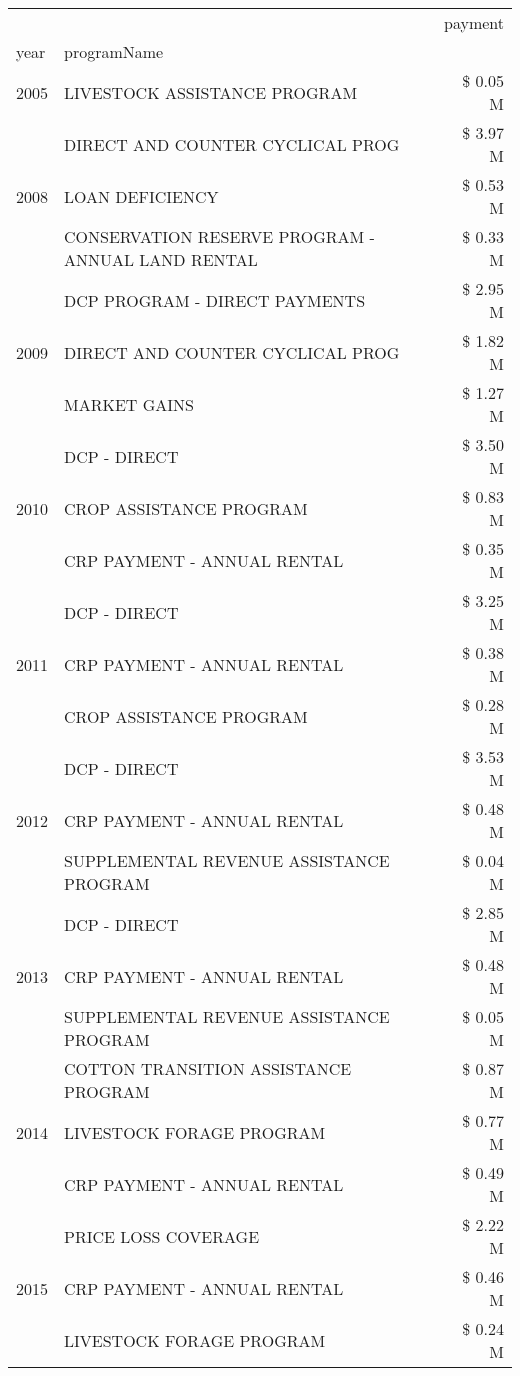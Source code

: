 \begin{tabular}{llr}
\toprule
 &  & payment \\
year & programName &  \\
\midrule
2005 & LIVESTOCK ASSISTANCE PROGRAM & \$ 0.05 M \\
\cline{1-3}
\multirow[t]{3}{*}{2008} & DIRECT AND COUNTER CYCLICAL PROG & \$ 3.97 M \\
 & LOAN DEFICIENCY & \$ 0.53 M \\
 & CONSERVATION RESERVE PROGRAM - ANNUAL LAND RENTAL & \$ 0.33 M \\
\cline{1-3}
\multirow[t]{3}{*}{2009} & DCP PROGRAM - DIRECT PAYMENTS & \$ 2.95 M \\
 & DIRECT AND COUNTER CYCLICAL PROG & \$ 1.82 M \\
 & MARKET GAINS & \$ 1.27 M \\
\cline{1-3}
\multirow[t]{3}{*}{2010} & DCP - DIRECT & \$ 3.50 M \\
 & CROP ASSISTANCE PROGRAM & \$ 0.83 M \\
 & CRP PAYMENT - ANNUAL RENTAL & \$ 0.35 M \\
\cline{1-3}
\multirow[t]{3}{*}{2011} & DCP - DIRECT & \$ 3.25 M \\
 & CRP PAYMENT - ANNUAL RENTAL & \$ 0.38 M \\
 & CROP ASSISTANCE PROGRAM & \$ 0.28 M \\
\cline{1-3}
\multirow[t]{3}{*}{2012} & DCP - DIRECT & \$ 3.53 M \\
 & CRP PAYMENT - ANNUAL RENTAL & \$ 0.48 M \\
 & SUPPLEMENTAL REVENUE ASSISTANCE PROGRAM & \$ 0.04 M \\
\cline{1-3}
\multirow[t]{3}{*}{2013} & DCP - DIRECT & \$ 2.85 M \\
 & CRP PAYMENT - ANNUAL RENTAL & \$ 0.48 M \\
 & SUPPLEMENTAL REVENUE ASSISTANCE PROGRAM & \$ 0.05 M \\
\cline{1-3}
\multirow[t]{3}{*}{2014} & COTTON TRANSITION ASSISTANCE PROGRAM & \$ 0.87 M \\
 & LIVESTOCK FORAGE PROGRAM & \$ 0.77 M \\
 & CRP PAYMENT - ANNUAL RENTAL & \$ 0.49 M \\
\cline{1-3}
\multirow[t]{3}{*}{2015} & PRICE LOSS COVERAGE & \$ 2.22 M \\
 & CRP PAYMENT - ANNUAL RENTAL & \$ 0.46 M \\
 & LIVESTOCK FORAGE PROGRAM & \$ 0.24 M \\

\end{tabular}
